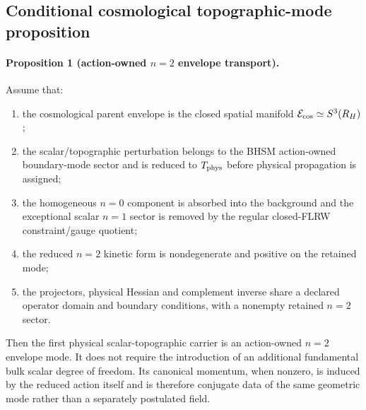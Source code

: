\subsection{Conditional cosmological topographic-mode proposition}

\paragraph{Proposition 1 (action-owned $n=2$ envelope transport).}
Assume that:

\begin{enumerate}
\item the cosmological parent envelope is the closed spatial manifold
      $\mathcal E_{\rm cos}\simeq S^3(R_H)$;
\item the scalar/topographic perturbation belongs to the BHSM
      action-owned boundary-mode sector and is reduced to
      $T_{\rm phys}$ before physical propagation is assigned;
\item the homogeneous $n=0$ component is absorbed into the background and
      the exceptional scalar $n=1$ sector is removed by the regular
      closed-FLRW constraint/gauge quotient;
\item the reduced $n=2$ kinetic form is nondegenerate and positive on the
      retained mode;
\item the projectors, physical Hessian and complement inverse share a
      declared operator domain and boundary conditions, with a nonempty
      retained $n=2$ sector.
\end{enumerate}

Then the first physical scalar-topographic carrier is an action-owned
$n=2$ envelope mode.  It does not require the introduction of an additional
fundamental bulk scalar degree of freedom.  Its canonical momentum, when
nonzero, is induced by the reduced action itself and is therefore conjugate
data of the same geometric mode rather than a separately postulated field.

